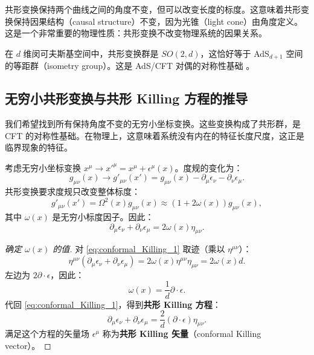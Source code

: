 \begin{remark}[因果结构]
共形变换保持两个曲线之间的角度不变，但可以改变长度的标度。这意味着共形变换保持因果结构（causal structure）不变，因为光锥（light cone）由角度定义。这是一个非常重要的物理性质：共形变换不改变物理系统的因果关系。
\end{remark}

\begin{theorem}
在 $d$ 维闵可夫斯基空间中，共形变换群是 $SO(2, d)$，这恰好等于 AdS$_{d+1}$ 空间的等距群（isometry group）。这是 AdS/CFT 对偶的对称性基础 \cite{Maldacena1997}。
\end{theorem}

\subsection{无穷小共形变换与共形 Killing 方程的推导}

\begin{note}[物理动机]
我们希望找到所有保持角度不变的无穷小坐标变换。这些变换构成了共形群，是 CFT 的对称性基础。在物理上，这意味着系统没有内在的特征长度尺度，这正是临界现象的特征。
\end{note}

\begin{theorem}
考虑无穷小坐标变换 $x^\mu \to x'^\mu = x^\mu + \epsilon^\mu(x)$。度规的变化为：
\begin{equation}
    g_{\mu\nu}(x) \to g'_{\mu\nu}(x') = g_{\mu\nu}(x) - \partial_\mu \epsilon_\nu - \partial_\nu \epsilon_\mu.
\end{equation}
共形变换要求度规只改变整体标度：
\begin{equation}
    g'_{\mu\nu}(x') = \Omega^2(x) g_{\mu\nu}(x) \approx (1 + 2\omega(x)) g_{\mu\nu}(x),
\end{equation}
其中 $\omega(x)$ 是无穷小标度因子。因此：
\begin{equation}
    \partial_\mu \epsilon_\nu + \partial_\nu \epsilon_\mu = 2\omega(x) \eta_{\mu\nu}.
    \label{eq:conformal_Killing_1}
\end{equation}
\end{theorem}

\begin{proof}[确定 $\omega(x)$ 的值]
对 \eqref{eq:conformal_Killing_1} 取迹（乘以 $\eta^{\mu\nu}$）：
\begin{equation}
    \eta^{\mu\nu} (\partial_\mu \epsilon_\nu + \partial_\nu \epsilon_\mu) = 2\omega(x) \eta^{\mu\nu} \eta_{\mu\nu} = 2\omega(x) d.
\end{equation}
左边为 $2\partial \cdot \epsilon$，因此：
\begin{equation}
    \omega(x) = \frac{1}{d} \partial \cdot \epsilon.
\end{equation}
代回 \eqref{eq:conformal_Killing_1}，得到\textbf{共形 Killing 方程}：
\begin{equation}
    \partial_\mu \epsilon_\nu + \partial_\nu \epsilon_\mu = \frac{2}{d} (\partial \cdot \epsilon) \eta_{\mu\nu}.
    \label{eq:conformal_Killing}
\end{equation}
满足这个方程的矢量场 $\epsilon^\mu$ 称为\textbf{共形 Killing 矢量}（conformal Killing vector）。
\end{proof}

